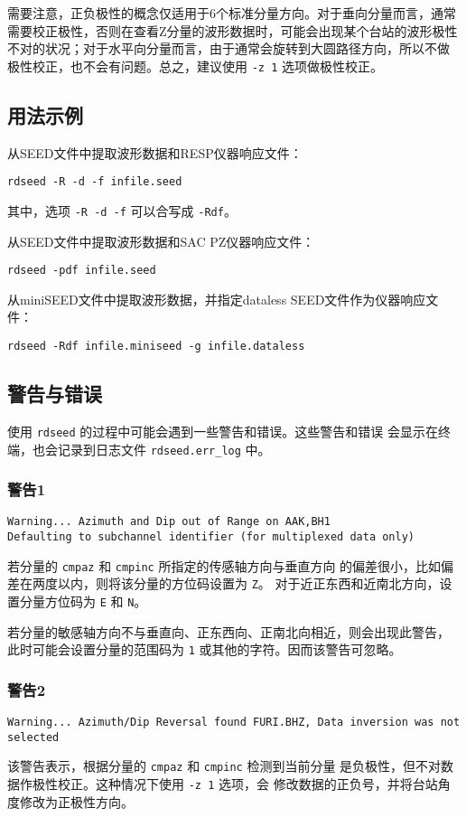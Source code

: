 需要注意，正负极性的概念仅适用于6个标准分量方向。对于垂向分量而言，通常
需要校正极性，否则在查看Z分量的波形数据时，可能会出现某个台站的波形极性
不对的状况；对于水平向分量而言，由于通常会旋转到大圆路径方向，所以不做
极性校正，也不会有问题。总之，建议使用 \texttt{-z 1} 选项做极性校正。

\subsection{用法示例}
从SEED文件中提取波形数据和RESP仪器响应文件：
\begin{verbatim}
rdseed -R -d -f infile.seed
\end{verbatim}
其中，选项 \texttt{-R -d -f} 可以合写成 \texttt{-Rdf}。

从SEED文件中提取波形数据和SAC PZ仪器响应文件：
\begin{verbatim}
rdseed -pdf infile.seed
\end{verbatim}

从miniSEED文件中提取波形数据，并指定dataless SEED文件作为仪器响应文件：
\begin{verbatim}
rdseed -Rdf infile.miniseed -g infile.dataless
\end{verbatim}

\subsection{警告与错误}
使用 \texttt{rdseed} 的过程中可能会遇到一些警告和错误。这些警告和错误
会显示在终端，也会记录到日志文件 \verb|rdseed.err_log| 中。

\subsubsection{警告1}
\begin{verbatim}
Warning... Azimuth and Dip out of Range on AAK,BH1
Defaulting to subchannel identifier (for multiplexed data only)
\end{verbatim}
若分量的 \texttt{cmpaz} 和 \texttt{cmpinc} 所指定的传感轴方向与垂直方向
的偏差很小，比如偏差在两度以内，则将该分量的方位码设置为 \texttt{Z}。
对于近正东西和近南北方向，设置分量方位码为 \texttt{E} 和 \texttt{N}。

若分量的敏感轴方向不与垂直向、正东西向、正南北向相近，则会出现此警告，
此时可能会设置分量的范围码为 \texttt{1} 或其他的字符。因而该警告可忽略。

\subsubsection{警告2}
\begin{verbatim}
Warning... Azimuth/Dip Reversal found FURI.BHZ, Data inversion was not selected
\end{verbatim}
该警告表示，根据分量的 \texttt{cmpaz} 和 \texttt{cmpinc} 检测到当前分量
是负极性，但不对数据作极性校正。这种情况下使用 \texttt{-z 1} 选项，会
修改数据的正负号，并将台站角度修改为正极性方向。

